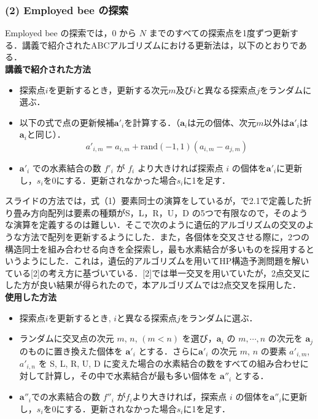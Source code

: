 \documentclass[a4paper, 10pt,  twocolumn]{ltjsarticle}
\begin{document}
\subsubsection*{(2) Employed bee の探索}
Employed bee の探索では，0 から $N$ までのすべての探索点を1度ずつ更新する．講義で紹介されたABCアルゴリズムにおける更新法は，以下のとおりである．\\
\textbf{講義で紹介された方法}
\begin{itemize}
    \item 探索点$i$を更新するとき，更新する次元$m$及び$i$と異なる探索点$j$をランダムに選ぶ．
    \item 以下の式で点の更新候補$\boldsymbol{a}'_i$を計算する．（$\boldsymbol{a}_i$は元の個体、次元$m$以外は$\boldsymbol{a}'_i$は$\boldsymbol{a}_i$と同じ）．
    \begin{equation}
        a'_{i, m} = a_{i, m} + \mathrm{rand}(-1, 1)(a_{i, m}-a_{j, m})
    \end{equation}
    \item $\boldsymbol{a}'_i$ での水素結合の数 $f'_i$ が $f_i$ より大きければ探索点 $i$ の個体を$\boldsymbol{a}'_i$に更新し，$s_i$を0にする．更新されなかった場合$s_i$に1を足す．
\end{itemize}
スライドの方法では，式（1）要素同士の演算をしているが，で2.1で定義した折り畳み方向配列は要素の種類がS，L，R，U，D の5つで有限なので，そのような演算を定義するのは難しい．そこで次のように遺伝的アルゴリズムの交叉のような方法で配列を更新するようにした．また，各個体を交叉させる際に，2つの構造同士を組み合わせる向きを全探索し，最も水素結合が多いものを採用するというようにした．これは，遺伝的アルゴリズムを用いてHP構造予測問題を解いている[2]の考え方に基づいている．[2]では単一交叉を用いていたが，2点交叉にした方が良い結果が得られたので，本アルゴリズムでは2点交叉を採用した．\\
\textbf{使用した方法}
\begin{itemize}
    \item 探索点$i$を更新するとき, $i$と異なる探索点$j$をランダムに選ぶ．
    \item ランダムに交叉点の次元 $m$, $n$, $(m < n)$ を選び，$\boldsymbol{a}_i$ の $ m,\cdots,n $ の次元を $\boldsymbol{a}_j$ のものに置き換えた個体を $\boldsymbol{a}'_i$ とする．さらに$\boldsymbol{a}'_i$ の次元 $m$, $n$ の要素 $a'_{i, m}$, $a'_{i, n}$ を S, L, R, U, D に変えた場合の水素結合の数をすべての組み合わせに対して計算し，その中で水素結合が最も多い個体を $\boldsymbol{a}''_i$ とする．
    \item $\boldsymbol{a}''_i$での水素結合の数 $f''_i$  が$f_i$より大きければ，探索点 $i$ の個体を$\boldsymbol{a}''_i$に更新し，$s_i$を0にする．更新されなかった場合$s_i$に1を足す．
\end{itemize}
\end{document}
